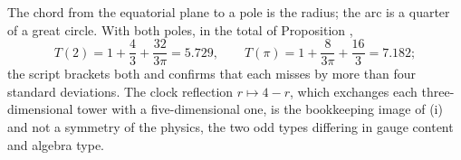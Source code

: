 The chord from the equatorial plane to a pole is the radius; the arc is a quarter of a great circle. With both poles, in the total of Proposition ,
\[
T(2) = 1 + \frac{4}{3} + \frac{32}{3\pi} = 5.729, \qquad T(\pi) = 1 + \frac{8}{3\pi} + \frac{16}{3} = 7.182 ;
\]
the script brackets both and confirms that each misses by more than four standard deviations. The clock reflection $r \mapsto 4 - r$, which exchanges each three-dimensional tower with a five-dimensional one, is the bookkeeping image of (i) and not a symmetry of the physics, the two odd types differing in gauge content and algebra type.

